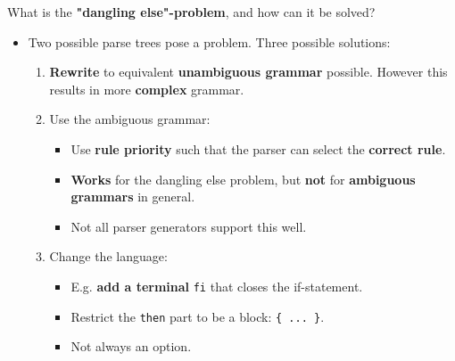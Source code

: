 \documentclass[11pt]{beamer}
\begin{document}
\begin{frame}

\begin{block}{What is the \textbf{"dangling else"-problem}, and how can it be solved?}
\begin{itemize}
\item Two possible parse trees pose a problem. Three possible solutions:
\begin{enumerate}
\item \textbf{Rewrite} to equivalent \textbf{unambiguous grammar} possible. However this results in more \textbf{complex} grammar.
\item Use the ambiguous grammar:
\begin{itemize}
\item Use \textbf{rule priority} such that the parser can select the \textbf{correct rule}.
\item \textbf{Works} for the dangling else problem, but \textbf{not} for \textbf{ambiguous grammars} in general.
\item Not all parser generators support this well.
\end{itemize}
\item Change the language:
\begin{itemize}
\item E.g. \textbf{add a terminal} \texttt{fi} that closes the if-statement.
\item Restrict the \texttt{then} part to be a block: \texttt{\{ ... \}}.
\item Not always an option.
\end{itemize}
\end{enumerate}
\end{itemize}
\end{block}
\end{frame}
\end{document}
